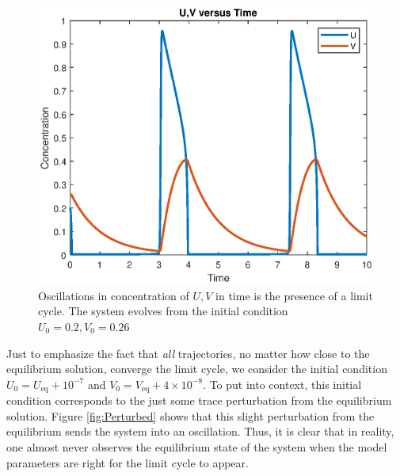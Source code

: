 \documentclass[twocolumn,amsmath,amssymb,aps]{revtex4}
\begin{document}
\begin{figure}[!htb]
	\centering
	\includegraphics[scale=0.5]{UV_Time.eps}
	\caption{Oscillations in concentration of $U,V$ in time is the presence of a limit cycle. The system evolves from the initial condition $U_0 = 0.2, V_0 = 0.26$}
	\label{fig:UVTime}
\end{figure}


Just to emphasize the fact that \textit{all} trajectories, no matter how close to the equilibrium solution, converge the limit cycle, we consider the initial condition $U_0 = U_{\text{eq}} + 10^{-7}$ and $V_0 = V_{\text{eq}} + 4\times 10^{-8}$. To put into context, this initial condition corresponds to the just some trace perturbation from the equilibrium solution. Figure \ref{fig:Perturbed} shows that this slight perturbation from the equilibrium sends the system into an oscillation. Thus, it is clear that in reality, one almost never observes the equilibrium state of the system when the model parameters are right for the limit cycle to appear. 
\end{document}
